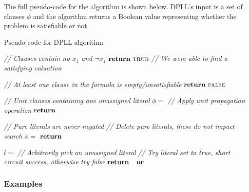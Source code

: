 \documentclass[a4paper,openany,12pt]{book}
\begin{document}
The full pseudo-code for the algorithm is shown below.
DPLL's input is a set of clauses $\phi$ and the algorithm returns a Boolean value representing whether the problem is
satisfiable or not.\\

\newcommand{\mycomment}[1]{\textcolor{dgrey}{\textit{// #1 }}}

\begin{algbox}{Pseudo-code for DPLL algorithm \citep{russell2016artificial}}
    \begin{algorithmic}
             \mycomment{Clauses contain no $x_1$ and $\neg x_1$}
                \State ${\bf return}~\textsc{true}$ \mycomment{We were able to find a satisfying valuation}
            \EndIf
    
             \State \mycomment{At least one clause in the formula is empty/unsatisfiable}
                \State ${\bf return}~\textsc{false}$
            \EndIf
    
             \mycomment{Unit clauses containing one unassigned literal}
                \State $\phi = $  \mycomment{Apply unit propagation operation}
                \State ${\bf return}$~
            \EndFor
    
             \mycomment{Pure literals are never negated}
                \State \mycomment{Delete pure literals, these do not impact search}
                \State $\phi = $ 
                \State ${\bf return}$~
            \EndFor
    
            \State $l = $  \State \mycomment{Arbitrarily pick an unassigned literal}
            \State \mycomment{Try literal set to true, short circuit success, otherwise try false}
            \State ${\bf return}$~~${\bf or}$~
        \EndFunction
    \end{algorithmic}
    \vspace{0.5em}
    \label{algorithm:sat:dpll}
\end{algbox}

\subsubsection{Examples}
\end{document}

